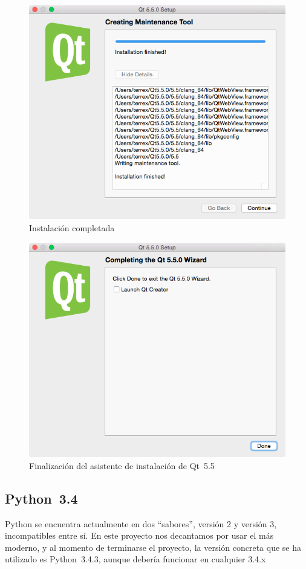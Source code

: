 \begin{figure}[htbp]
\centering
\includegraphics[width=11.5cm]{qt-7}
\caption{Instalación completada}
\label{fig:qt-7}
\end{figure}

\begin{figure}[htbp]
\centering
\includegraphics[width=11.5cm]{qt-8}
\caption{Finalización del asistente de instalación de Qt~5.5}
\label{fig:qt-8}
\end{figure}


\subsection{Python~3.4}

Python se encuentra actualmente en dos ``sabores'', versión 2 y versión 3, incompatibles entre sí. En este proyecto nos decantamos por usar el más moderno, y al momento de terminarse el proyecto, la versión concreta que se ha utilizado es Python~3.4.3, aunque debería funcionar en cualquier 3.4.x

